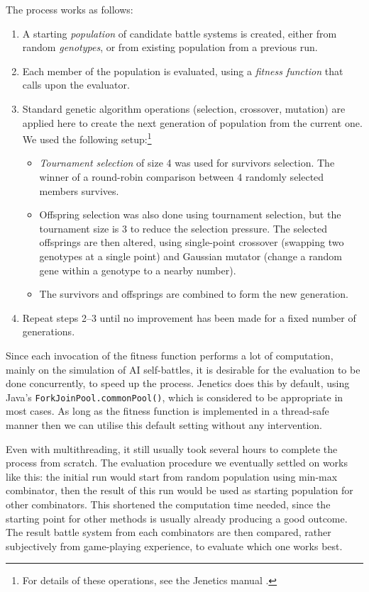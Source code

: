 The process works as follows:
\begin{enumerate}
	\item A starting \textit{population} of candidate battle systems is created, either from random \textit{genotypes}, or from existing population from a previous run.
	\item Each member of the population is evaluated, using a \textit{fitness function} that calls upon the evaluator.
	\item Standard genetic algorithm operations (selection, crossover, mutation) are applied here to create the next generation of population from the current one. We used the following setup:\footnote{For details of these operations, see the Jenetics manual \cite{jenetics-manual}.}
	\begin{itemize}
		\item \textit{Tournament selection} of size 4 was used for survivors selection. The winner of a round-robin comparison between 4 randomly selected members survives.
		\item Offspring selection was also done using tournament selection, but the tournament size is 3 to reduce the selection pressure. The selected offsprings are then altered, using single-point crossover (swapping two genotypes at a single point) and Gaussian mutator (change a random gene within a genotype to a nearby number).
		\item The survivors and offsprings are combined to form the new generation.
	\end{itemize} 
	\item Repeat steps 2--3 until no improvement has been made for a fixed number of generations.
\end{enumerate}

Since each invocation of the fitness function performs a lot of computation, mainly on the simulation of AI self-battles, it is desirable for the evaluation to be done concurrently, to speed up the process. Jenetics does this by default, using Java's \texttt{ForkJoinPool.commonPool()}, which is considered to be appropriate in most cases.\cite{jenetics-manual} As long as the fitness function is implemented in a thread-safe manner then we can utilise this default setting without any intervention.

Even with multithreading, it still usually took several hours to complete the process from scratch. The evaluation procedure we eventually settled on works like this: the initial run would start from random population using min-max combinator, then the result of this run would be used as starting population for other combinators. This shortened the computation time needed, since the starting point for other methods is usually already producing a good outcome. The result battle system from each combinators are then compared, rather subjectively from game-playing experience, to evaluate which one works best.

